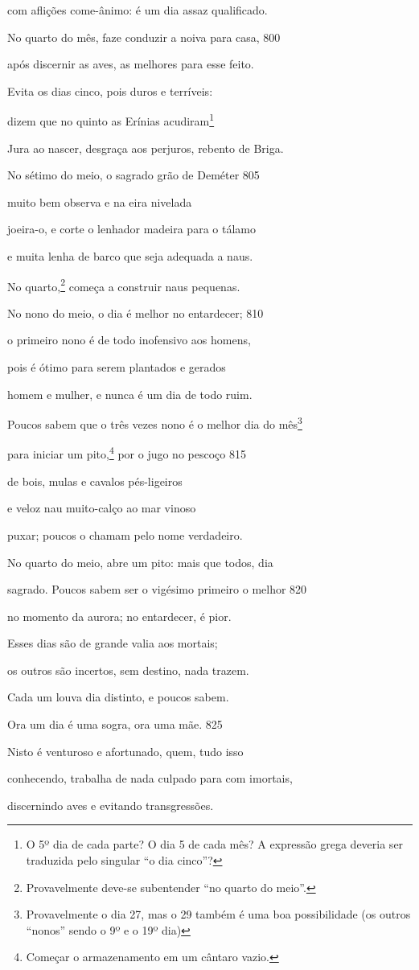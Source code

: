 com aflições come-ânimo: é um dia assaz qualificado.

No quarto do mês, faze conduzir a noiva para casa, \num{800}

após discernir as aves, as melhores para esse feito.

Evita os dias cinco, pois duros e terríveis:

dizem que no quinto as Erínias acudiram\footnote{O 5º dia de cada parte? O dia 5 de cada mês? A expressão grega deveria ser traduzida pelo singular ``o dia cinco''?}

Jura ao nascer, desgraça aos perjuros, rebento de Briga.

No sétimo do meio, o sagrado grão de Deméter \num{805}

muito bem observa e na eira nivelada

joeira-o, e corte o lenhador madeira para o tálamo

e muita lenha de barco que seja adequada a naus.

No quarto,\footnote{Provavelmente deve-se subentender ``no quarto do meio''.} começa a construir naus pequenas.

No nono do meio, o dia é melhor no entardecer; \num{810}

o primeiro nono é de todo inofensivo aos homens,

pois é ótimo para serem plantados e gerados

homem e mulher, e nunca é um dia de todo ruim.

Poucos sabem que o três vezes nono é o melhor dia do mês\footnote{Provavelmente o dia 27, mas o 29 também é uma boa possibilidade (os
outros ``nonos'' sendo o 9º e o 19º dia)}

para iniciar um pito,\footnote{Começar o armazenamento em um cântaro vazio.} por o jugo no pescoço \num{815}

de bois, mulas e cavalos pés-ligeiros

e veloz nau muito-calço ao mar vinoso

puxar; poucos o chamam pelo nome verdadeiro.

No quarto do meio, abre um pito: mais que todos, dia

sagrado. Poucos sabem ser o vigésimo primeiro o melhor \num{820}

no momento da aurora; no entardecer, é pior.

Esses dias são de grande valia aos mortais;

os outros são incertos, sem destino, nada trazem.

Cada um louva dia distinto, e poucos sabem.

Ora um dia é uma sogra, ora uma mãe. \num{825}

Nisto é venturoso e afortunado, quem, tudo isso

conhecendo, trabalha de nada culpado para com imortais,

discernindo aves e evitando transgressões.

\endgroup